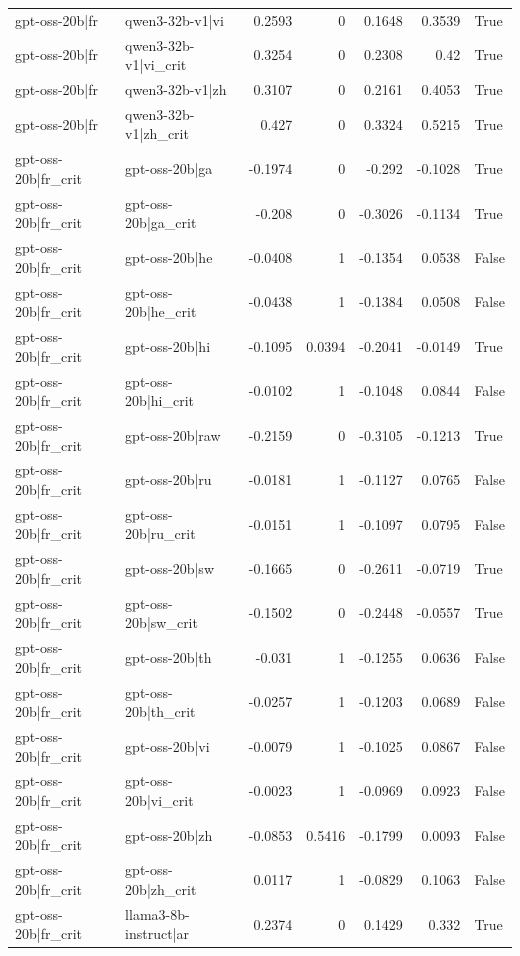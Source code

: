 \begin{table}
\begin{tabular}{l l r r r r l}
gpt-oss-20b|fr & qwen3-32b-v1|vi & 0.2593 & 0 & 0.1648 & 0.3539 & True \\
gpt-oss-20b|fr & qwen3-32b-v1|vi_crit & 0.3254 & 0 & 0.2308 & 0.42 & True \\
gpt-oss-20b|fr & qwen3-32b-v1|zh & 0.3107 & 0 & 0.2161 & 0.4053 & True \\
gpt-oss-20b|fr & qwen3-32b-v1|zh_crit & 0.427 & 0 & 0.3324 & 0.5215 & True \\
gpt-oss-20b|fr_crit & gpt-oss-20b|ga & -0.1974 & 0 & -0.292 & -0.1028 & True \\
gpt-oss-20b|fr_crit & gpt-oss-20b|ga_crit & -0.208 & 0 & -0.3026 & -0.1134 & True \\
gpt-oss-20b|fr_crit & gpt-oss-20b|he & -0.0408 & 1 & -0.1354 & 0.0538 & False \\
gpt-oss-20b|fr_crit & gpt-oss-20b|he_crit & -0.0438 & 1 & -0.1384 & 0.0508 & False \\
gpt-oss-20b|fr_crit & gpt-oss-20b|hi & -0.1095 & 0.0394 & -0.2041 & -0.0149 & True \\
gpt-oss-20b|fr_crit & gpt-oss-20b|hi_crit & -0.0102 & 1 & -0.1048 & 0.0844 & False \\
gpt-oss-20b|fr_crit & gpt-oss-20b|raw & -0.2159 & 0 & -0.3105 & -0.1213 & True \\
gpt-oss-20b|fr_crit & gpt-oss-20b|ru & -0.0181 & 1 & -0.1127 & 0.0765 & False \\
gpt-oss-20b|fr_crit & gpt-oss-20b|ru_crit & -0.0151 & 1 & -0.1097 & 0.0795 & False \\
gpt-oss-20b|fr_crit & gpt-oss-20b|sw & -0.1665 & 0 & -0.2611 & -0.0719 & True \\
gpt-oss-20b|fr_crit & gpt-oss-20b|sw_crit & -0.1502 & 0 & -0.2448 & -0.0557 & True \\
gpt-oss-20b|fr_crit & gpt-oss-20b|th & -0.031 & 1 & -0.1255 & 0.0636 & False \\
gpt-oss-20b|fr_crit & gpt-oss-20b|th_crit & -0.0257 & 1 & -0.1203 & 0.0689 & False \\
gpt-oss-20b|fr_crit & gpt-oss-20b|vi & -0.0079 & 1 & -0.1025 & 0.0867 & False \\
gpt-oss-20b|fr_crit & gpt-oss-20b|vi_crit & -0.0023 & 1 & -0.0969 & 0.0923 & False \\
gpt-oss-20b|fr_crit & gpt-oss-20b|zh & -0.0853 & 0.5416 & -0.1799 & 0.0093 & False \\
gpt-oss-20b|fr_crit & gpt-oss-20b|zh_crit & 0.0117 & 1 & -0.0829 & 0.1063 & False \\
gpt-oss-20b|fr_crit & llama3-8b-instruct|ar & 0.2374 & 0 & 0.1429 & 0.332 & True \\

\end{tabular}
\end{table}
